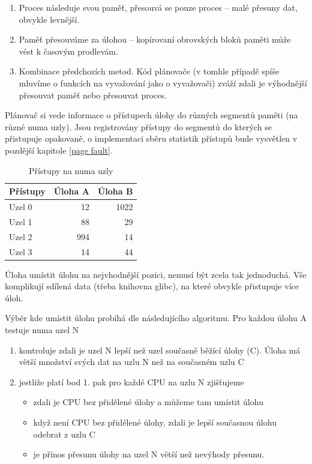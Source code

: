 \documentclass[
  field=ainfk,
  biblatex,
  glossaries,
  index
]{kidiplom}
\begin{document}
\begin{enumerate}
\item Proces následuje svou paměť, přesouvá se pouze proces – malé přesuny dat, obvykle levnější.
\item Paměť přesouváme za úlohou – kopírovaní obrovských bloků paměti může vést k časovým prodlevám.
\item Kombinace předchozích metod. Kód plánovače (v tomhle případě spíše mluvíme o funkcích na vyvažování jako o vyvažovači) zváží zdali je výhodnější přesouvat paměť nebo přesouvat proces.
\end{enumerate}

Plánovač si vede informace o přístupech úlohy do různých segmentů paměti (na různé numa uzly). Jsou registrovány přístupy do segmentů do kterých se přistupuje opakovaně, o implementaci sběru statistik přístupů bude vysvětlen v pozdější kapitole \ref{page fault}.

\begin{table}[h]
\centering
\begin{tabular}{|l|r|r|}
\hline
Přístupy & Úloha A & Úloha B \\
\hline
Uzel 0 & 12 & 1022 \\
\hline
Uzel 1 & 88 & 29 \\
\hline
Uzel 2 & 994 & 14 \\
\hline
Uzel 3 & 14 & 44 \\
\hline
\end{tabular}

\caption{Přístupy na numa uzly}
\label{table1}
\end{table}

Úloha umístit úlohu na nejvhodnější pozici, nemusí být zcela tak jednoduchá. Vše komplikují sdílená data (třeba knihovna glibc), na které obvykle přistupuje více úloh. 

Výběr kde umístit úlohu probíhá dle následujícího algoritmu. 
Pro každou úlohu A testuje numa uzel N
\begin{enumerate}
\item kontroluje zdali je uzel N lepší než uzel současně běžící úlohy (C). Úloha má větší množství svých dat na uzlu N než na současném uzlu C
\item jestliže platí bod 1. pak pro každé CPU na uzlu N zjišťujeme 
\begin{itemize}
\item zdali je CPU bez přidělené úlohy a můžeme tam umístit úlohu
\item když není CPU bez přidělené úlohy,  zdali je lepší současnou úlohu odebrat z uzlu C
\item je přínos přesunu úlohy na uzel N větší než nevýhody přesunu.
\end{itemize}
\end{enumerate}
\end{document}
